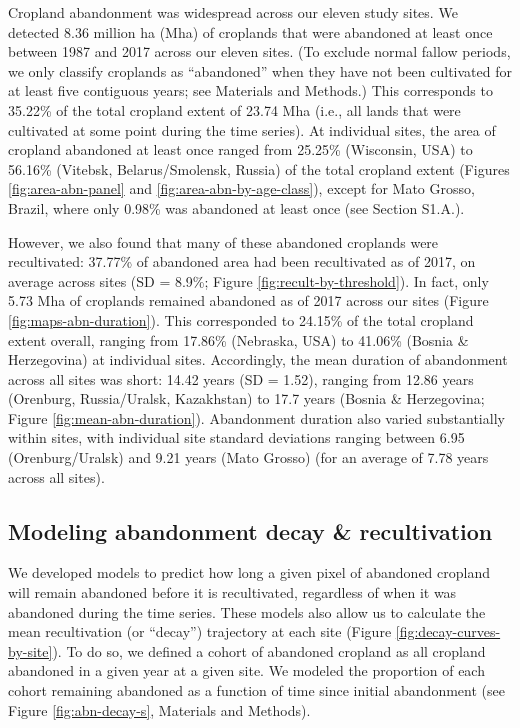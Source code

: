 \documentclass[9pt,twocolumn,twoside,lineno]{pnas-new}
\begin{document}
Cropland abandonment was widespread across our eleven study sites.
We detected 8.36 million ha (Mha) of croplands that were abandoned at least once between 1987 and 2017 across our eleven sites.
(To exclude normal fallow periods, we only classify croplands as ``abandoned'' when they have not been cultivated for at least five contiguous years; see Materials and Methods.)
This corresponds to 35.22\% of the total cropland extent of 23.74 Mha (i.e., all lands that were cultivated at some point during the time series).
At individual sites, the area of cropland abandoned at least once ranged from 25.25\% (Wisconsin, USA) to 56.16\% (Vitebsk, Belarus/Smolensk, Russia) of the total cropland extent (Figures \ref{fig:area-abn-panel} and \ref{fig:area-abn-by-age-class}), except for Mato Grosso, Brazil, where only 0.98\% was abandoned at least once (see Section S1.A.).

However, we also found that many of these abandoned croplands were recultivated: 37.77\% of abandoned area had been recultivated as of 2017, on average across sites (SD = 8.9\%; Figure \ref{fig:recult-by-threshold}).
In fact, only 5.73 Mha of croplands remained abandoned as of 2017 across our sites (Figure \ref{fig:maps-abn-duration}).
This corresponded to 24.15\% of the total cropland extent overall, ranging from 17.86\% (Nebraska, USA) to 41.06\% (Bosnia \& Herzegovina) at individual sites.
Accordingly, the mean duration of abandonment across all sites was short: 14.42 years (SD = 1.52), ranging from 12.86 years (Orenburg, Russia/Uralsk, Kazakhstan) to 17.7 years (Bosnia \& Herzegovina; Figure \ref{fig:mean-abn-duration}).
Abandonment duration also varied substantially within sites, with individual site standard deviations ranging between 6.95 (Orenburg/Uralsk) and 9.21 years (Mato Grosso) (for an average of 7.78 years across all sites).

\hypertarget{modeling-abandonment-decay-recultivation}{%
\subsection*{Modeling abandonment decay \& recultivation}\label{modeling-abandonment-decay-recultivation}}

We developed models to predict how long a given pixel of abandoned cropland will remain abandoned before it is recultivated, regardless of when it was abandoned during the time series.
These models also allow us to calculate the mean recultivation (or ``decay'') trajectory at each site (Figure \ref{fig:decay-curves-by-site}).
To do so, we defined a cohort of abandoned cropland as all cropland abandoned in a given year at a given site.
We modeled the proportion of each cohort remaining abandoned as a function of time since initial abandonment (see Figure \ref{fig:abn-decay-s}, Materials and Methods).
\end{document}
